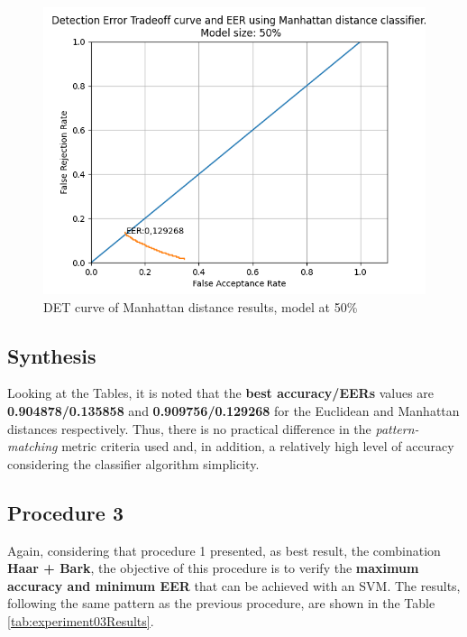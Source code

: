 			\begin{figure}[H]
				\centering
				\includegraphics[scale=.6]{images/results/det/DET_for_classifier_Manhattan_50}
				\caption{DET curve of Manhattan distance results, model at 50\%}
				\label{fig:detforclassifiermanhattan50}
			\end{figure}
		
			
		
	\subsection{Synthesis}
		\par Looking at the Tables, it is noted that the \textbf{best accuracy/EERs} values are \textbf{0.904878/0.135858} and \textbf{0.909756/0.129268} for the Euclidean and Manhattan distances respectively. Thus, there is no practical difference in the \textit{pattern-matching} metric criteria used and, in addition, a relatively high level of accuracy considering the classifier algorithm simplicity.
		
	\subsection{Procedure 3}
		\label{chap:testsResults:sec:Experimento03}
		
		\par Again, considering that procedure 1 presented, as best result, the combination \textbf{Haar + Bark}, the objective of this procedure is to verify the \textbf{maximum accuracy and minimum EER} that can be achieved with an SVM. The results, following the same pattern as the previous procedure, are shown in the Table \ref{tab:experiment03Results}.
				
